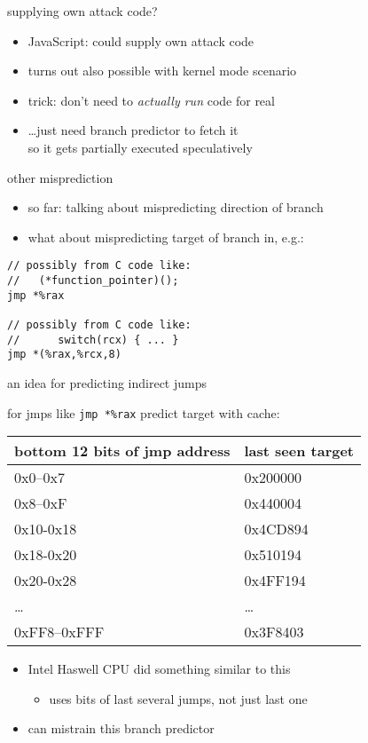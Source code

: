 \begin{frame}{supplying own attack code?}
    \begin{itemize}
    \item JavaScript: could supply own attack code
    \vspace{.5cm}
    \item turns out also possible with kernel mode scenario
    \item trick: don't need to \textit{actually run} code for real
    \item \ldots just need branch predictor to fetch it \\
        so it gets partially executed speculatively
    \end{itemize}
\end{frame}

\begin{frame}[fragile]{other misprediction}
\begin{itemize}
\item so far: talking about mispredicting direction of branch
\item what about mispredicting target of branch in, e.g.:
\end{itemize}
\begin{lstlisting}[language=myasm]
// possibly from C code like:
//   (*function_pointer)();
jmp *%rax           

// possibly from C code like:
//      switch(rcx) { ... }
jmp *(%rax,%rcx,8)  
\end{lstlisting}
\end{frame}

\begin{frame}[fragile]{an idea for predicting indirect jumps}

for jmps like \lstinline|jmp *%rax| predict target with cache: \\
\begin{tabular}{ll}
bottom 12 bits of jmp address & last seen target \\ \hline
0x0--0x7 & 0x200000 \\
0x8--0xF & 0x440004 \\
0x10-0x18 & 0x4CD894 \\
0x18-0x20 & 0x510194 \\
0x20-0x28 & 0x4FF194 \\
\ldots & \ldots \\
0xFF8--0xFFF & 0x3F8403 \\
\end{tabular}
\begin{itemize}
\item Intel Haswell CPU did something similar to this
    \begin{itemize}
    \item uses bits of last several jumps, not just last one
    \end{itemize}
\item can mistrain this branch predictor
\end{itemize}
\end{frame}

